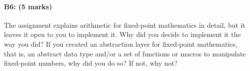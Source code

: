 \paragraph{B6: (5 marks)}
The assignment explains arithmetic for fixed-point mathematics in detail, but it leaves it open to you to implement it.  Why did you decide to implement it the way you did?  If you created an abstraction layer for fixed-point mathematics, that is, an abstract data type and/or a set of functions or macros to manipulate fixed-point numbers, why did you do so?  If not, why not?